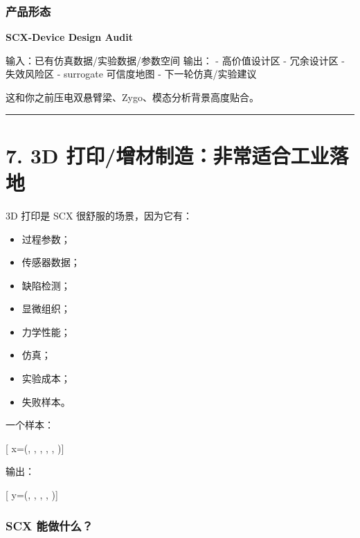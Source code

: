 \documentclass[
  12pt,
]{ctexart}
\newenvironment{Shaded}{}{}
\newcommand{\NormalTok}[1]{#1}
\providecommand{\tightlist}{%
  \setlength{\itemsep}{0pt}\setlength{\parskip}{0pt}}
\begin{document}
\subsubsection{产品形态}\label{ux4ea7ux54c1ux5f62ux6001}

\textbf{SCX-Device Design Audit}

\begin{Shaded}
\begin{Highlighting}[]
\NormalTok{输入：已有仿真数据/实验数据/参数空间}
\NormalTok{输出：}
\NormalTok{{-} 高价值设计区}
\NormalTok{{-} 冗余设计区}
\NormalTok{{-} 失效风险区}
\NormalTok{{-} surrogate 可信度地图}
\NormalTok{{-} 下一轮仿真/实验建议}
\end{Highlighting}
\end{Shaded}

这和你之前压电双悬臂梁、Zygo、模态分析背景高度贴合。

\begin{center}\rule{0.5\linewidth}{0.5pt}\end{center}

\section{7. 3D
打印/增材制造：非常适合工业落地}\label{d-ux6253ux5370ux589eux6750ux5236ux9020ux975eux5e38ux9002ux5408ux5de5ux4e1aux843dux5730}

3D 打印是 SCX 很舒服的场景，因为它有：

\begin{itemize}
\tightlist
\item
  过程参数；
\item
  传感器数据；
\item
  缺陷检测；
\item
  显微组织；
\item
  力学性能；
\item
  仿真；
\item
  实验成本；
\item
  失败样本。
\end{itemize}

一个样本：

{[} x=(, , ,
, , ){]}

输出：

{[} y=(, , ,
, ){]}

\subsubsection{SCX 能做什么？}\label{scx-ux80fdux505aux4ec0ux4e48-1}
\end{document}
